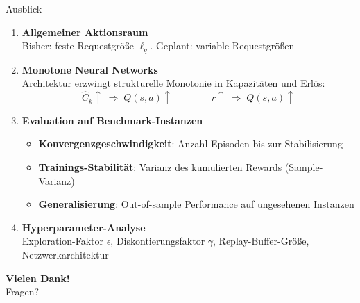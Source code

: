 \documentclass[aspectratio=169]{beamer}
\begin{document}
\begin{frame}{Ausblick}

  \begin{enumerate}

    \item \textbf{Allgemeiner Aktionsraum} \\
          Bisher: feste Requestgröße $\ell_q$.
          Geplant: variable Requestgrößen

    \bigskip
    \item \textbf{Monotone Neural Networks} \\
          Architektur erzwingt strukturelle Monotonie in Kapazitäten und Erlös:
          \[
            \hat{C}_k \uparrow \;\Rightarrow\; Q(s,a) \uparrow
            \qquad\qquad
            r \uparrow \;\Rightarrow\; Q(s,a) \uparrow
          \]

    \bigskip
    \item \textbf{Evaluation auf Benchmark-Instanzen} \\
          \begin{itemize}
            \item \textbf{Konvergenzgeschwindigkeit}: Anzahl Episoden bis zur Stabilisierung
            \item \textbf{Trainings-Stabilität}: Varianz des kumulierten Rewards (Sample-Varianz)
            \item \textbf{Generalisierung}: Out-of-sample Performance auf ungesehenen Instanzen
          \end{itemize}

    \bigskip
    \item \textbf{Hyperparameter-Analyse} \\
          Exploration-Faktor $\epsilon$, Diskontierungsfaktor $\gamma$, Replay-Buffer-Größe, Netzwerkarchitektur

  \end{enumerate}

\end{frame}

\begin{frame}
  \begin{center}
    \Huge\textbf{Vielen Dank!}\\[1em]
    \large Fragen?
  \end{center}
\end{frame}
\end{document}
